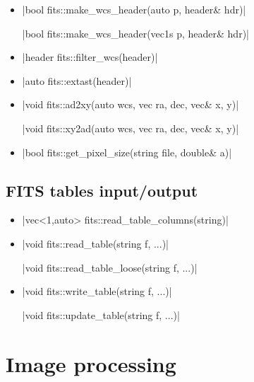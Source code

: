 \documentclass[12pt]{report}
\begin{document}
\begin{itemize}
\item \cppinline|bool fits::make_wcs_header(auto p, header& hdr)| 

\cppinline|bool fits::make_wcs_header(vec1s p, header& hdr)|

\item \cppinline|header fits::filter_wcs(header)| 

\item \cppinline|auto fits::extast(header)| 

\item \cppinline|void fits::ad2xy(auto wcs, vec ra, dec, vec& x, y)| 

\cppinline|void fits::xy2ad(auto wcs, vec ra, dec, vec& x, y)| 

\item \cppinline|bool fits::get_pixel_size(string file, double& a)| 

\end{itemize}

\subsection{FITS tables input/output}

\begin{itemize}
\item \cppinline|vec<1,auto> fits::read_table_columns(string)| 

\item \cppinline|void fits::read_table(string f, ...)| 

\cppinline|void fits::read_table_loose(string f, ...)| 

\item \cppinline|void fits::write_table(string f, ...)| 

\cppinline|void fits::update_table(string f, ...)| 

\end{itemize}


\section{Image processing \label{SEC:support:image}}
\end{document}
